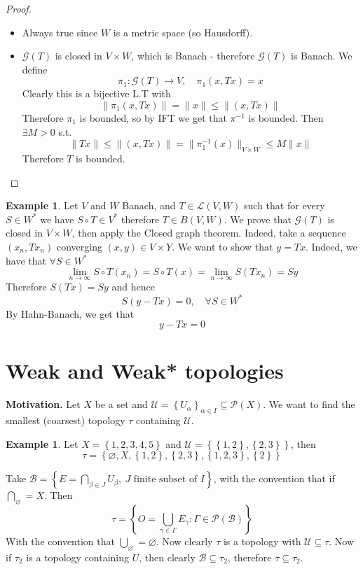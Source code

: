 \documentclass[11pt,a4paper]{article}
\theoremstyle{definition}
\newtheorem{example}[definition]{Example}
\theoremstyle{plain}
\theoremstyle{remark}
\renewcommand{\set}[1]{\left\{ #1 \right\}}
\newcommand{\norm}[1]{\lVert #1 \rVert}
\newcommand{\1}{\mathbbm{1}}
\begin{document}
\begin{proof}
    \begin{itemize}
        \item[($\implies$)] Always true since $W$ is a metric space (so Hausdorff). 
        \item[($\impliedby$)] $\mathcal{G}(T)$ is closed in $V \times W$, which is Banach - therefore $\mathcal{G}(T)$ is Banach. We define 
        $$\pi_1 \colon \mathcal{G}(T) \to V, \quad \pi_1(x, Tx) = x$$
        Clearly this is a bijective L.T with 
        $$\norm{\pi_1(x, Tx)} = \norm{x} \le \norm{(x, Tx)}$$
        Therefore $\pi_1$ is bounded, so by IFT we get that $\pi^{-1}$ is bounded. Then $\exists M > 0$ s.t. 
        $$\norm{Tx} \le \norm{(x, Tx)} = \norm{\pi_1^{-1}(x)}_{V \times W} \le M \norm{x}$$
        Therefore $T$ is bounded. 
    \end{itemize}
\end{proof}

\begin{example}
    Let $V$ and $W$ Banach, and $T \in \mathcal{L}(V, W)$ such that for every $S \in W^*$ we have $S \circ T \in V^*$ therefore $T \in B(V, W)$. 
    We prove that $\mathcal{G}(T)$ is closed in $V \times W$, then apply the Closed graph theorem. Indeed, take a sequence $(x_n, Tx_n)$ converging $(x, y) \in V \times Y$. 
    We want to show that $y = Tx$. Indeed, we have that $\forall S \in W^*$ 
    $$\lim_{n \to \infty} S \circ T (x_n) = S \circ T (x) = \lim_{n \to \infty} S (Tx_n) = Sy$$
    Therefore $S(Tx) = Sy$ and hence 
    $$S(y - Tx) = 0, \quad \forall S \in W^*$$
    By Hahn-Banach, we get that 
    $$y - Tx = 0$$ 
\end{example}

\section{Weak and Weak* topologies}

\textbf{Motivation.} Let $X$ be a set and $\mathcal{U} = \set{U_\alpha}_{\alpha \in I} \subseteq \mathcal{P}(X)$. We want to find the smallest (coarsest) topology $\tau$ containing $\mathcal{U}$.

\begin{example}
    Let $X = \set{1, 2,3,4,5}$ and $\mathcal{U} = \set{\set{1,2}, \set{2,3}}$, then
    $$\tau = \set{\varnothing, X, \set{1,2}, \set{2,3}, \set{1,2,3}, \set{2}}$$
\end{example}

Take $\mathcal{B} = \set{E = \bigcap_{\beta \in J} U_\beta, \ J \text{ finite subset of $I$}}$, with the convention that if $\bigcap_{\varnothing} = X$.
Then
$$\tau = \set{O = \bigcup_{\gamma \in \Gamma} E_\gamma \colon \Gamma \in \mathcal{P}(\mathcal{B})}$$
With the convention that $\bigcup_{\varnothing} = \varnothing$. Now clearly $\tau$ is a topology with $\mathcal{U} \subseteq \tau$.
Now if $\tau_2$ is a topology containing $U$, then clearly $\mathcal{B} \subseteq \tau_2$, therefore $\tau \subseteq \tau_2$.
\end{document}
